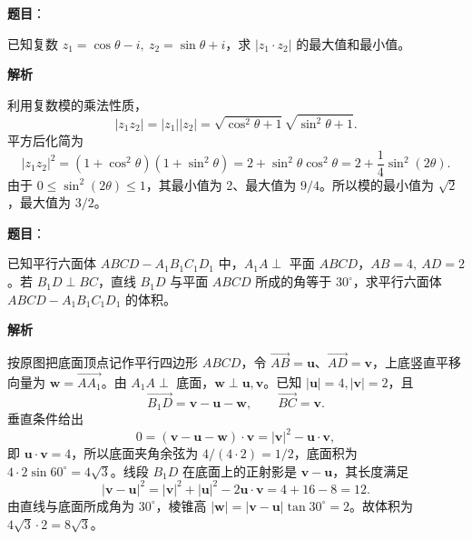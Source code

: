 \begin{answer}

\textbf{题目}：

已知复数 \(z_1=\cos\theta-i,\ z_2=\sin\theta+i\)，求 \(|z_1\cdot z_2|\) 的最大值和最小值。

\textbf{解析}

利用复数模的乘法性质，
\nopagebreak[4]
\[
|z_1z_2|=|z_1||z_2|
=\sqrt{\cos^2\theta+1}\sqrt{\sin^2\theta+1}.
\]
平方后化简为
\nopagebreak[4]
\[
|z_1z_2|^2=(1+\cos^2\theta)(1+\sin^2\theta)
=2+\sin^2\theta\cos^2\theta
=2+\frac14\sin^2(2\theta).
\]
由于 \(0\leq\sin^2(2\theta)\leq1\)，其最小值为 2、最大值为 \(9/4\)。所以模的最小值为 \(\sqrt2\)，最大值为 \(3/2\)。


\end{answer}
\begin{answer}

\textbf{题目}：

已知平行六面体 \(ABCD-A_1B_1C_1D_1\) 中，\(A_1A\perp\) 平面 \(ABCD\)，\(AB=4,\ AD=2\)。若 \(B_1D\perp BC\)，直线 \(B_1D\) 与平面 \(ABCD\) 所成的角等于 \(30^\circ\)，求平行六面体 \(ABCD-A_1B_1C_1D_1\) 的体积。
\nopagebreak[4]
\begin{center}\end{center}
\nopagebreak[4]
\textbf{解析}

按原图把底面顶点记作平行四边形 \(ABCD\)，令 \(\vec{AB}=\mathbf u\)、\(\vec{AD}=\mathbf v\)，上底竖直平移向量为 \(\mathbf w=\vec{AA_1}\)。由 \(A_1A\perp\) 底面，\(\mathbf w\perp\mathbf u,\mathbf v\)。已知 \(|\mathbf u|=4,|\mathbf v|=2\)，且
\nopagebreak[4]
\[
\overrightarrow{B_1D}=\mathbf v-\mathbf u-\mathbf w,
\qquad \overrightarrow{BC}=\mathbf v.
\]
垂直条件给出
\nopagebreak[4]
\[
0=(\mathbf v-\mathbf u-\mathbf w)\cdot\mathbf v
=|\mathbf v|^2-\mathbf u\cdot\mathbf v,
\]
即 \(\mathbf u\cdot\mathbf v=4\)，所以底面夹角余弦为 \(4/(4\cdot2)=1/2\)，底面积为 \(4\cdot2\sin60^\circ=4\sqrt3\)。线段 \(B_1D\) 在底面上的正射影是 \(\mathbf v-\mathbf u\)，其长度满足
\nopagebreak[4]
\[
|\mathbf v-\mathbf u|^2=|\mathbf v|^2+|\mathbf u|^2-2\mathbf u\cdot\mathbf v=4+16-8=12.
\]
由直线与底面所成角为 \(30^\circ\)，棱锥高 \(|\mathbf w|=|\mathbf v-\mathbf u|\tan30^\circ=2\)。故体积为 \(4\sqrt3\cdot2=8\sqrt3\)。


\end{answer}
